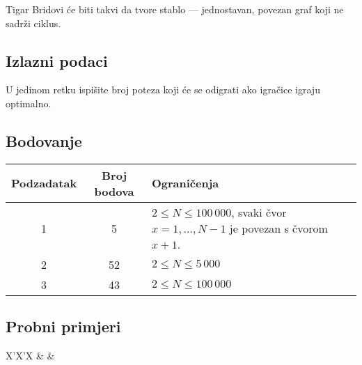 \begin{statement}[
  problempoints=100,
  timelimit=3 sekunde,
  memorylimit=512 MiB,
]{Tigar}
Bridovi će biti takvi da tvore stablo --- jednostavan, povezan graf koji ne
sadrži ciklus.

\subsection*{Izlazni podaci}

U jedinom retku ispišite broj poteza koji će se odigrati ako igračice igraju
optimalno.

\subsection*{Bodovanje}

{\renewcommand{\arraystretch}{1.4}
  \setlength{\tabcolsep}{6pt}
  \begin{tabular}{ccl}
   Podzadatak & Broj bodova & Ograničenja \\ \midrule
    1 & 5 & $2 \le N \le 100\,000$, svaki čvor $x=1,\ldots,N-1$ je povezan s čvorom $x+1$.\\
    2 & 52 & $2 \le N \le 5\,000$ \\
    3 & 43 & $2 \le N \le 100\,000$
\end{tabular}}

\subsection*{Probni primjeri}
\begin{tabularx}{\textwidth}{X'X'X}
 &
 &
\end{tabularx}

\end{statement}

